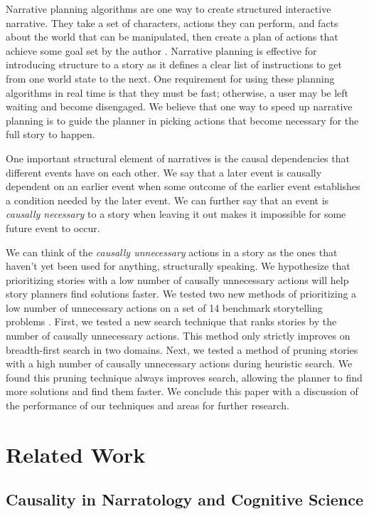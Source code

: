 \documentclass[letterpaper]{article} %
\begin{document}
Narrative planning algorithms are one way to create structured interactive narrative. They take a set of characters, actions they can perform, and facts about the world that can be manipulated, then create a plan of actions that achieve some goal set by the author \cite{young2013plans}. Narrative planning is effective for introducing structure to a story as it defines a clear list of instructions to get from one world state to the next. One requirement for using these planning algorithms in real time is that they must be fast; otherwise, a user may be left waiting and become disengaged. We believe that one way to speed up narrative planning is to guide the planner in picking actions that become necessary for the full story to happen.

One important structural element of narratives is the causal dependencies that different events have on each other. We say that a later event is causally dependent on an earlier event when some outcome of the earlier event establishes a condition needed by the later event. We can further say that an event is \textit{causally necessary} to a story when leaving it out makes it impossible for some future event to occur.

We can think of the \textit{causally unnecessary} actions in a story as the ones that haven't yet been used for anything, structurally speaking. We hypothesize that prioritizing stories with a low number of causally unnecessary actions will help story planners find solutions faster. We tested two new methods of prioritizing a low number of unnecessary actions on a set of 14 benchmark storytelling problems \cite{ware2023collection}. First, we tested a new search technique that ranks stories by the number of causally unnecessary actions. This method only strictly improves on breadth-first search in two domains. Next, we tested a method of pruning stories with a high number of causally unnecessary actions during heuristic search. We found this pruning technique always improves search, allowing the planner to find more solutions and find them faster. We conclude this paper with a discussion of the performance of our techniques and areas for further research.

\section{Related Work}

\subsection{Causality in Narratology and Cognitive Science}
\end{document}
